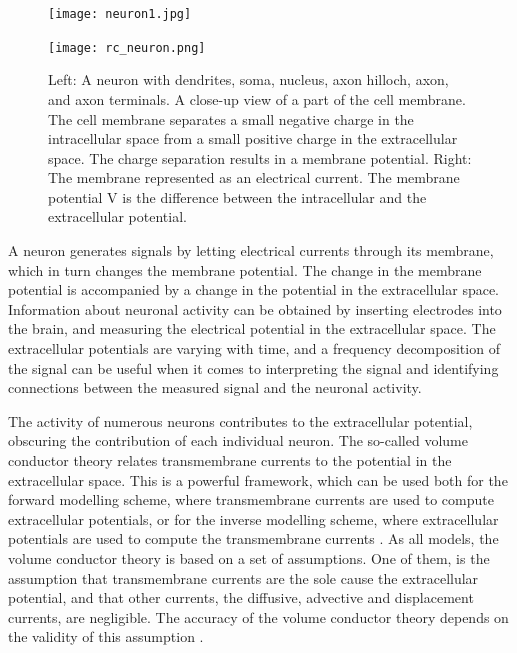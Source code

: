 \documentclass{uiophd}
\begin{document}
\begin{figure}[!tbp]
  \centering
  \begin{minipage}[b]{0.5\textwidth}
    \texttt{[image: neuron1.jpg]}
  \end{minipage}
  \hfill
  \begin{minipage}[b]{0.45\textwidth}
    \texttt{[image: rc\_neuron.png]}
  \end{minipage}  
   \caption{Left: A neuron with dendrites, soma, nucleus, axon hilloch, axon, and axon terminals. A close-up view of a part of the cell membrane. The cell membrane separates a small negative charge in the intracellular space from a small positive charge in the extracellular space. The charge separation results in a membrane potential. Right: The membrane represented as an electrical current. The membrane potential V is the difference between the intracellular and the extracellular potential.}
  \label{fig:neuronalmembrane}
\end{figure}


A neuron generates signals by letting electrical currents through its membrane, which in turn changes the membrane potential. The change in the membrane potential is accompanied by a change in the potential in the extracellular space. Information about neuronal activity can be obtained by inserting electrodes into the brain, and measuring the electrical potential in the extracellular space. The extracellular potentials are varying with time, and a frequency decomposition of the signal can be useful when it comes to interpreting the signal and identifying connections between the measured signal and the neuronal activity.

The activity of numerous neurons contributes to the extracellular potential, obscuring the contribution of each individual neuron. The so-called volume conductor theory relates transmembrane currents to the potential in the extracellular space. This is a powerful framework, which can be used both for the forward modelling scheme, where transmembrane currents are used to compute extracellular potentials, or for the inverse modelling scheme, where extracellular potentials are used to compute the transmembrane currents \cite{Einevoll2013}. As all models, the volume conductor theory is based on a set of assumptions. One of them, is the assumption that transmembrane currents are the sole cause the extracellular potential, and that other currents, the diffusive, advective and displacement currents, are negligible. The accuracy of the volume conductor theory depends on the validity of this assumption \cite{Gratiy2017}.
\end{document}
